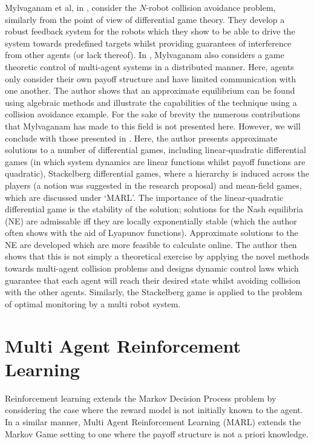 \documentclass[.../main.tex]{subfiles}
\begin{document}
Mylvaganam et al, in \cite{Mylvaganam2017AutonomousApproach}, consider
the $N$-robot collision avoidance problem, similarly from the point of
view of differential game theory. They develop a robust feedback
system for the robots which they show to be able to drive the system
towards predefined targets whilst providing guarantees of interference
from other agents (or lack thereof).  In \cite{MylvaganamASystems},
Mylvaganam also considers a game theoretic control of multi-agent
systems in a distributed manner. Here, agents only consider their own
payoff structure and have limited communication with one another. The
author shows that an approximate equilibrium can be found using
algebraic methods and illustrate the capabilities of the technique
using a collision avoidance example. For the sake of brevity the
numerous contributions that Mylvaganam has made to this field is not
presented here. However, we will conclude with those presented in
\cite{Mylvaganam2014}. Here, the author presents approximate solutions
to a number of differential games, including linear-quadratic
differential games (in which system dynamics are linear functions
whilst payoff functions are quadratic), Stackelberg differential
games, where a hierarchy is induced across the players (a notion was
suggested in the research proposal) and mean-field games, which are
discussed under `MARL'. The importance of the linear-quadratic
differential game is the stability of the solution; solutions for the
Nash equilibria (NE) are admissable iff they are locally exponentially
stable (which the author often shows with the aid of Lyapunov
functions). Approximate solutions to the NE are developed which are
more feasible to calculate online. The author then shows that this is
not simply a theoretical exercise by applying the novel methods
towards multi-agent collision problems and designs dynamic control
laws which guarantee that each agent will reach their desired state
whilst avoiding collision with the other agents. Similarly, the
Stackelberg game is applied to the problem of optimal monitoring by a
multi robot system.

\section{Multi Agent Reinforcement Learning} \label{sec::MARL}

Reinforcement learning extends the Markov Decision Process problem by
considering the case where the reward model is not initially known to
the agent. In a similar manner, Multi Agent Reinforcement Learning
(MARL) extends the Markov Game setting to one where the payoff
structure is not a priori knowledge.
\end{document}
